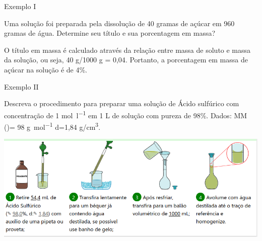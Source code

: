 \documentclass[presentation,professionalfonts,aspectratio=169]{beamer}
\begin{document}
\begin{frame}[label={sec:orgfc65e19}]{Exemplo I}
\begin{question}
Uma solução foi preparada pela dissolução de 40 gramas de açúcar em 960 gramas de água. Determine seu título e sua porcentagem em massa?
\end{question}

\begin{answer}[print=true]
O título em massa é calculado através da relação entre massa de soluto e massa da solução, ou seja, 40 g/1000 g = \alert{0,04}. Portanto, a porcentagem em massa de açúcar na solução é de \alert{4\%}.
\end{answer}
\end{frame}


\begin{frame}[label={sec:orge38996a}]{Exemplo II}
\begin{question}
Descreva o procedimento para preparar uma solução de Ácido sulfúrico com concentração de 1 \unit{\mol\per\litre} em 1 L de solução com pureza de 98\%. Dados: MM ()= 98 \unit{\gram\per\mol} d=1,84 g/cm\textsuperscript{3}.

\begin{center}
\includegraphics[scale=.3]{FQ/Solucoes/acid.png}
\end{center}
\end{question}
\end{frame}
\end{document}
